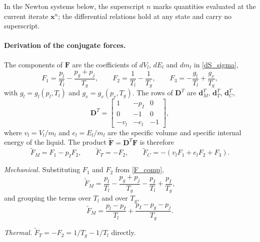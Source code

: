 In the Newton systems below, the superscript $n$ marks quantities evaluated at the current iterate $\boldsymbol{x}^n$; the differential relations hold at any state and carry no superscript.

\paragraph{Derivation of the conjugate forces.}
The components of $\boldsymbol{F}$ are the coefficients of $dV_l$, $dE_l$ and $dm_l$ in \eqref{dS_sigma},
\begin{equation}\label{F_comp}
F_1=\frac{p_l}{T_l}-\frac{p_g+p_{j}}{T_g},\qquad
F_2=\frac1{T_l}-\frac1{T_g},\qquad
F_3=-\frac{g_l}{T_l}+\frac{g_v}{T_g},
\end{equation}
with $g_l=g_l(p_l,T_l)$ and $g_v=g_v(p_v,T_g)$. The rows of $\boldsymbol{D}^T$ are $\boldsymbol{d}_M^T$, $\boldsymbol{d}_T^T$, $\boldsymbol{d}_C^T$,
\begin{equation}\label{DT}
\boldsymbol{D}^T=\begin{bmatrix}1&-p_I&0\\0&-1&0\\-v_l&-e_l&-1\end{bmatrix},
\end{equation}
where $v_l=V_l/m_l$ and $e_l=E_l/m_l$ are the specific volume and specific internal energy of the liquid. The product $\tilde{\boldsymbol{F}}=\boldsymbol{D}^T\boldsymbol{F}$ is therefore
\begin{equation}\label{f_rows}
\tilde{F}_M=F_1-p_IF_2,\qquad \tilde{F}_T=-F_2,\qquad \tilde{F}_C=-(v_lF_1+e_lF_2+F_3) .
\end{equation}

\emph{Mechanical.} Substituting $F_1$ and $F_2$ from \eqref{F_comp},
\begin{equation}
\tilde{F}_M=\frac{p_l}{T_l}-\frac{p_g+p_{j}}{T_g}-\frac{p_I}{T_l}+\frac{p_I}{T_g},
\end{equation}
and grouping the terms over $T_l$ and over $T_g$,
\begin{equation}
\tilde{F}_M=\frac{p_l-p_I}{T_l}+\frac{p_I-p_g-p_{j}}{T_g}.
\end{equation}

\emph{Thermal.} $\tilde{F}_T=-F_2=1/T_g-1/T_l$ directly.

